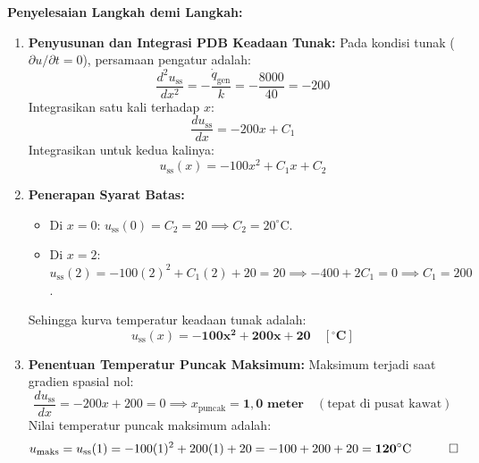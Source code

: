 \documentclass[11pt,a4paper]{article}
\theoremstyle{definition}
\begin{document}
\noindent\textbf{Penyelesaian Langkah demi Langkah:}
\begin{enumerate}[leftmargin=*]
    \item \textbf{Penyusunan dan Integrasi PDB Keadaan Tunak:}
    Pada kondisi tunak ($\partial u/\partial t = 0$), persamaan pengatur adalah:
    \begin{equation*}
        \frac{d^2 u_{\text{ss}}}{dx^2} = -\frac{\dot{q}_{\text{gen}}}{k} = -\frac{8000}{40} = -200
    \end{equation*}
    Integrasikan satu kali terhadap $x$:
    \begin{equation*}
        \frac{d u_{\text{ss}}}{dx} = -200 x + C_1
    \end{equation*}
    Integrasikan untuk kedua kalinya:
    \begin{equation*}
        u_{\text{ss}}(x) = -100 x^2 + C_1 x + C_2
    \end{equation*}
    
    \item \textbf{Penerapan Syarat Batas:}
    \begin{itemize}[leftmargin=*]
        \item Di $x = 0$: $u_{\text{ss}}(0) = C_2 = 20 \implies C_2 = 20^\circ\text{C}$.
        \item Di $x = 2$: $u_{\text{ss}}(2) = -100(2)^2 + C_1(2) + 20 = 20 \implies -400 + 2C_1 = 0 \implies C_1 = 200$.
    \end{itemize}
    Sehingga kurva temperatur keadaan tunak adalah:
    \begin{equation*}
        u_{\text{ss}}(x) = \mathbf{-100 x^2 + 200 x + 20\quad [^\circ\text{C}]}
    \end{equation*}
    
    \item \textbf{Penentuan Temperatur Puncak Maksimum:}
    Maksimum terjadi saat gradien spasial nol:
    \begin{equation*}
        \frac{d u_{\text{ss}}}{dx} = -200 x + 200 = 0 \implies x_{\text{puncak}} = \mathbf{1{,}0\text{ meter}} \quad (\text{tepat di pusat kawat})
    \end{equation*}
    Nilai temperatur puncak maksimum adalah:
    \begin{equation*}
        u_{\text{maks}} = u_{\text{ss}}(1) = -100(1)^2 + 200(1) + 20 = -100 + 200 + 20 = \mathbf{120^\circ\text{C}} \quad \qed
    \end{equation*}
\end{enumerate}
\end{document}
